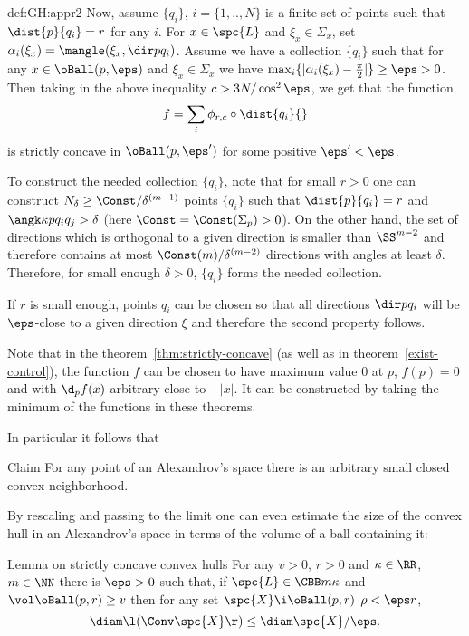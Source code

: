 {\begin{subthm}{def:GH:appr2}
Now, assume $\{q_i\}$, $i=\{1,..,N\}$ is a finite set of points such that $\dist{p}{q_i}=r$ for any $i$. 
For $x\in \spc{L}$ and $\xi_x\in \Sigma_x$, set $\alpha_i(\xi_x)=\mangle(\xi_x,\dir p{q_i})$. 
Assume we have a collection $\{q_i\}$ such
that for any $x\in \oBall(p,\eps)$ and $\xi_x\in \Sigma_x$ we have  $\max_i\{|\alpha_i(\xi_x)-\tfrac\pi2|\}\ge\eps>0$. 
Then  taking in the above inequality $c>3N/\cos^2\eps$, we get that the function
$$f=\sum_i \phi_{r,c}\circ\dist{q_i}{}$$
is strictly concave in $\oBall(p,{\eps'})$ for some positive $\eps'<\eps$.

To construct the needed collection $\{q_i\}$, note that for small $r>0$ one can
construct $N_\delta\ge \Const/\delta^{(m-1)}$ points $\{q_i\}$ such that $\dist{p}{q_i}=r$
and $\angk \kappa p{q_i}{q_j}>\delta$ (here $\Const=\Const(\Sigma_p)>0$).
On the other hand, the set of directions which is orthogonal to a given direction
is smaller than $\SS^{m-2}$ and therefore contains at most
$\Const(m)/\delta^{(m-2)}$ directions with angles at least $\delta$. 
Therefore, for small enough $\delta>0$, $\{q_i\}$ forms the needed collection.

If $r$ is small enough, points $q_i$ can be chosen so that all directions
$\dir p{q_i}$ will be $\eps$-close to a given direction $\xi$ and
therefore the second property follows.
\qeds

Note that in the theorem~\ref{thm:strictly-concave} (as well as in
theorem~\ref{exist-control}), the function $f$ can be chosen to have maximum value $0$ at $p$,
$f(p)=0$ and with $\d_p f(x)$ arbitrary close to $-|x|$.
It can be constructed by taking the minimum of the functions in these theorems. 

In particular it follows that

\begin{thm}{Claim}\label{cor:convex-nbhd}
For any point of an Alexandrov's space there is an arbitrary small closed convex
neighborhood.
\end{thm}

By rescaling and passing to the limit one can even estimate the size of the convex
hull in an Alexandrov's space in terms of the volume of a ball containing it:

\begin{thm}{Lemma on strictly concave convex hulls \cite[4.3]{perelman-petrunin:extremal}}
For any $v>0$, $r>0$ and $\kappa\in \RR$, $m\in\NN$ there is $\eps>0$ such that,
if $\spc{L}\in\CBB m \kappa$ and $\vol \oBall(p,{r})\ge v$ then for any set $\spc{X}\i\oBall(p,{r})$  $\rho<\eps r$, 
$$\diam\l(\Conv \spc{X}\r)\le \diam \spc{X}/\eps.$$


\end{thm}
\end{subthm}}
